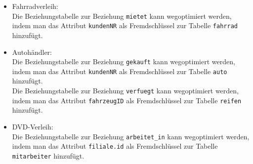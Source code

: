 \begin{Answer}[ref=Optimierung]
	\begin{itemize}
		\item Fahrradverleih:\\
		Die Beziehungstabelle zur Beziehung \lstinline!mietet! kann wegoptimiert werden, indem man das Attribut \lstinline!kundenNR! als Fremdschlüssel zur Tabelle \lstinline!fahrrad! hinzufügt.
		\item Autohändler:\\
		Die Beziehungstabelle zur Beziehung \lstinline!gekauft! kann wegoptimiert werden, indem man das Attribut \lstinline!kundenNR! als Fremdschlüssel zur Tabelle \lstinline!auto! hinzufügt.\\
		Die Beziehungstabelle zur Beziehung \lstinline!verfuegt! kann wegoptimiert werden, indem man das Attribut \lstinline!fahrzeugID! als Fremdschlüssel zur Tabelle \lstinline!reifen! hinzufügt.
		\item DVD-Verleih:\\
		Die Beziehungstabelle zur Beziehung \lstinline!arbeitet_in! kann wegoptimiert werden, indem man das Attribut \lstinline!filiale.id! als Fremdschlüssel zur Tabelle \lstinline!mitarbeiter! hinzufügt.
	\end{itemize}
\end{Answer}